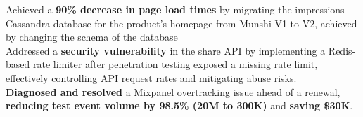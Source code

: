 \documentclass[]{Nikhil_Kadiyan_Resume}
\begin{document}
\pt Achieved a \textbf{90\% decrease in page load times} by migrating the impressions Cassandra database for the product's homepage from Munshi V1 to V2, achieved by changing the schema of the database\\
\pt Addressed a \textbf{security vulnerability} in the share API by implementing a Redis-based rate limiter after penetration testing exposed a missing rate limit, effectively controlling API request rates and mitigating abuse risks.\\
\pt \textbf{Diagnosed and resolved} a Mixpanel overtracking issue ahead of a renewal, \textbf{reducing test event volume by 98.5\% (20M to 300K)} and \textbf{saving \$30K}.\\ %
\sectionsep
\end{document}
